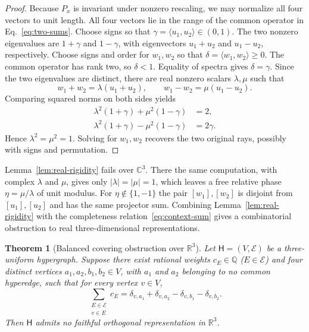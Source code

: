 \documentclass[twocolumn,aps,pra,floatfix,amsmath,amssymb,longbibliography]{revtex4-2}
\newenvironment{handrewrite}{\leavevmode\color{blue}}{}
\newtheorem{theorem}{Theorem}
\theoremstyle{definition}
\theoremstyle{remark}
\newcommand{\C}{\mathbb C}
\newcommand{\R}{\mathbb R}
\begin{document}
\begin{proof}
Because $P_x$ is invariant under nonzero rescaling, we may normalize all four
vectors to unit length.  All four vectors lie in the range of the common
operator in Eq.~\eqref{eq:two-sums}.  Choose signs so that
$\gamma=\langle u_1,u_2\rangle\in(0,1)$.  The two nonzero eigenvalues
are $1+\gamma$ and $1-\gamma$, with eigenvectors $u_1+u_2$ and
$u_1-u_2$, respectively.  Choose signs and order for $w_1,w_2$ so
that $\delta=\langle w_1,w_2\rangle\ge0$.  The common operator has rank two,
so $\delta<1$.  Equality of spectra gives
$\delta=\gamma$.  Since the two eigenvalues are distinct, there are real
nonzero scalars $\lambda,\mu$ such that
\[
 w_1+w_2=\lambda(u_1+u_2),\qquad
 w_1-w_2=\mu(u_1-u_2).
\]
Comparing squared norms on both sides yields
\begin{align*}
 \lambda^2(1+\gamma)+\mu^2(1-\gamma)&=2,\\
 \lambda^2(1+\gamma)-\mu^2(1-\gamma)&=2\gamma.
\end{align*}
Hence $\lambda^2=\mu^2=1$.  Solving for $w_1,w_2$ recovers the two
original rays, possibly with signs and permutation.
\end{proof}

\begin{handrewrite}
Lemma~\ref{lem:real-rigidity} fails over $\C^3$.  There the same computation,
with complex $\lambda$ and $\mu$, gives only $|\lambda|=|\mu|=1$, which leaves
a free relative phase $\eta=\mu/\lambda$ of unit modulus.  For
$\eta\notin\{1,-1\}$ the pair $[w_1],[w_2]$ is disjoint from $[u_1],[u_2]$
and has the same projector sum.  Combining Lemma~\ref{lem:real-rigidity}
with the completeness relation~\eqref{eq:context-sum} gives a combinatorial
obstruction to real three-dimensional representations.
\end{handrewrite}

\begin{theorem}[Balanced covering obstruction over $\R^3$]
\label{thm:covering-criterion}
Let $\mathsf H=(V,\mathcal E)$ be a three-uniform hypergraph.  Suppose there
exist rational weights $c_E\in\mathbb Q$ ($E\in\mathcal E$) and four distinct
vertices $a_1,a_2,b_1,b_2\in V$, with $a_1$ and $a_2$ belonging to no common
hyperedge, such that for every vertex $v\in V$,
\begin{equation}
 \sum_{\substack{E\in\mathcal E\\ v\in E}} c_E
 =\delta_{v,a_1}+\delta_{v,a_2}-\delta_{v,b_1}-\delta_{v,b_2}.
 \label{eq:covering-criterion}
\end{equation}
Then $\mathsf H$ admits no faithful orthogonal representation in $\R^3$.
\end{theorem}
\end{document}

